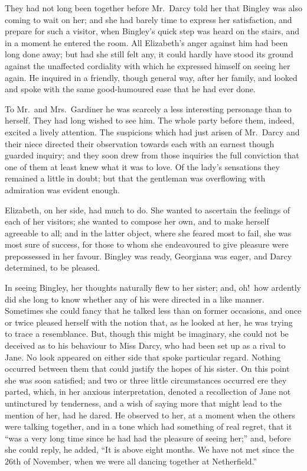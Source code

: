 \documentclass[12pt,english]{book}
\begin{document}
They had not long been together before Mr.\ Darcy told her that Bingley
was also coming to wait on her; and she had barely time to express
her satisfaction, and prepare for such a visitor, when Bingley's quick
step was heard on the stairs, and in a moment he entered the room.
All Elizabeth's anger against him had been long done away; but had
she still felt any, it could hardly have stood its ground against
the unaffected cordiality with which he expressed himself on seeing
her again. He inquired in a friendly, though general way, after her
family, and looked and spoke with the same good-humoured ease that
he had ever done.

To Mr.\ and Mrs.\ Gardiner he was scarcely a less interesting personage
than to herself. They had long wished to see him. The whole party
before them, indeed, excited a lively attention. The suspicions which
had just arisen of Mr.\ Darcy and their niece directed their observation
towards each with an earnest though guarded inquiry; and they soon
drew from those inquiries the full conviction that one of them at
least knew what it was to love. Of the lady's sensations they remained
a little in doubt; but that the gentleman was overflowing with admiration
was evident enough.

Elizabeth, on her side, had much to do. She wanted to ascertain the
feelings of each of her visitors; she wanted to compose her own, and
to make herself agreeable to all; and in the latter object, where
she feared most to fail, she was most sure of success, for those to
whom she endeavoured to give pleasure were prepossessed in her favour.
Bingley was ready, Georgiana was eager, and Darcy determined, to be
pleased.

In seeing Bingley, her thoughts naturally flew to her sister; and,
oh!\ how ardently did she long to know whether any of his were directed
in a like manner. Sometimes she could fancy that he talked less than
on former occasions, and once or twice pleased herself with the notion
that, as he looked at her, he was trying to trace a resemblance. But,
though this might be imaginary, she could not be deceived as to his
behaviour to Miss Darcy, who had been set up as a rival to Jane. No
look appeared on either side that spoke particular regard. Nothing
occurred between them that could justify the hopes of his sister.
On this point she was soon satisfied; and two or three little circumstances
occurred ere they parted, which, in her anxious interpretation, denoted
a recollection of Jane not untinctured by tenderness, and a wish of
saying more that might lead to the mention of her, had he dared. He
observed to her, at a moment when the others were talking together,
and in a tone which had something of real regret, that it {}``was
a very long time since he had had the pleasure of seeing her;'' and,
before she could reply, he added, {}``It is above eight months. We
have not met since the 26th of November, when we were all dancing
together at Netherfield.''
\end{document}
